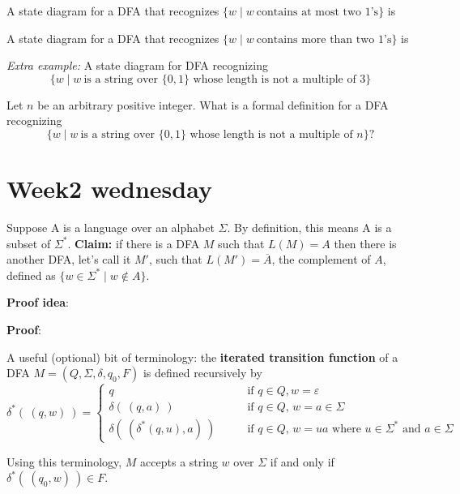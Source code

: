 \documentclass[12pt, oneside]{article}
\begin{document}
A state diagram for a DFA that recognizes $\{w \mid w~\text{contains at most two $1$'s} \}$ is

\vspace{70pt}

A state diagram for a DFA that recognizes $\{w \mid w~\text{contains more than two $1$'s} \}$ is

\vspace{70pt}


\newpage
{\it Extra example:} A state diagram for DFA recognizing
$$\{w \mid w~\text{is a string over $\{0,1\}$ whose length is not a multiple of $3$} \}$$

\vspace{70pt}


Let $n$ be an arbitrary positive integer. What is a formal definition for a DFA recognizing
\[
\{w \mid w~\text{is a string over $\{0,1\}$ whose length is not a multiple of $n$} \}?
\]

\vspace{70pt} \vfill
\section*{Week2 wednesday}


Suppose A is a language over an alphabet $\Sigma$. By definition, this means A is a subset of $\Sigma^*$.
{\bf Claim:} if there is a DFA $M$ such that $L(M) = A$ then there is another DFA, let's call it $M'$, such that 
$L(M') = \overline{A}$, the complement of $A$, defined as $\{ w \in \Sigma^* \mid w \notin A \}$.

{\bf Proof idea}:


{\bf Proof}: 




\vfill
A useful (optional) bit of terminology: the {\bf iterated transition function} of a DFA
$M = (Q, \Sigma, \delta, q_0, F)$ is defined recursively by
\[
\delta^* (~(q,w)~) 
=\begin{cases}
q  \qquad &\text{if $q \in Q, w = \varepsilon$} \\
\delta( ~(q,a)~) \qquad &\text{if $q \in Q$, $w = a \in \Sigma$ } \\
\delta(~(\delta^*(q,u), a) ~) \qquad &\text{if $q \in Q$, $w = ua$ where $u \in  \Sigma^*$ and $a \in \Sigma$}
\end{cases}
\]

Using  this terminology, $M$ accepts a string $w$ over $\Sigma$ if and only if $\delta^*( ~(q_0,w)~) \in F$.

\newpage
\end{document}

